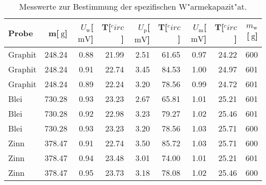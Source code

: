
\begin{table}[!h]
\begin{center}
\begin{tabular}{|l|r|r|r|r|r|r|r|r|}
\hline
Probe & m[$\SI{}{\gram}$] & $U_\mathrm{w}$[$\SI{}{\milli\volt}$] & T[$^circ$] & $U_\mathrm{p}$[$\SI{}{\milli\volt}$] & T[$^circ$] & $U_\mathrm{m}$[$\SI{}{\milli\volt}$] & T[$^circ$] & $m_\mathrm{w}$[$\SI{}{\gram}$]\\
\hline
\hline
Graphit & 248.24 & 0.88 & 21.99 & 2.51 & 61.65 & 0.97 & 24.22 & 600 \\
Graphit & 248.24 & 0.91 & 22.74 & 3.45 & 84.53 & 1.00 & 24.97 & 601 \\
Graphit & 248.24 & 0.89 & 22.24 & 3.20 & 78.56 & 0.99 & 24.72 & 601 \\
\hline
Blei    & 730.28 & 0.93 & 23.23 & 2.67 & 65.81 & 1.01 & 25.21 & 601 \\
Blei    & 730.28 & 0.92 & 22.98 & 3.23 & 79.27 & 1.02 & 25.46 & 601 \\
Blei    & 730.28 & 0.93 & 23.23 & 3.20 & 78.56 & 1.03 & 25.71 & 600 \\
\hline
Zinn    & 378.47 & 0.91 & 22.74 & 3.50 & 85.72 & 1.03 & 25.71 & 600 \\
Zinn    & 378.47 & 0.94 & 23.48 & 3.01 & 74.00 & 1.01 & 25.21 & 601 \\
Zinn    & 378.47 & 0.95 & 23.73 & 3.18 & 78.08 & 1.02 & 25.46 & 600 \\
\hline
\end{tabular}
\caption[]{Messwerte zur Bestimmung der spezifischen W"armekapazit"at.}
\label{proben}
\end{center}
\end{table}